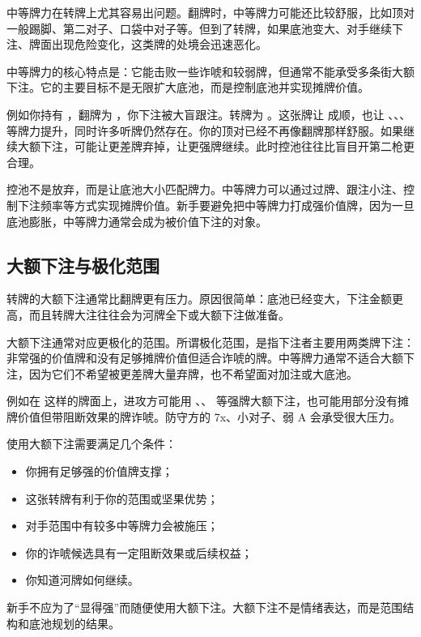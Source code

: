 中等牌力在转牌上尤其容易出问题。翻牌时，中等牌力可能还比较舒服，比如顶对一般踢脚、第二对子、口袋中对子等。但到了转牌，如果底池变大、对手继续下注、牌面出现危险变化，这类牌的处境会迅速恶化。

中等牌力的核心特点是：它能击败一些诈唬和较弱牌，但通常不能承受多条街大额下注。它的主要目标不是无限扩大底池，而是控制底池并实现摊牌价值。

例如你持有 ，翻牌为 ，你下注被大盲跟注。转牌为 。这张牌让  成顺，也让 、、、 等牌力提升，同时许多听牌仍然存在。你的顶对已经不再像翻牌那样舒服。如果继续大额下注，可能让更差牌弃掉，让更强牌继续。此时控池往往比盲目开第二枪更合理。

控池不是放弃，而是让底池大小匹配牌力。中等牌力可以通过过牌、跟注小注、控制下注频率等方式实现摊牌价值。新手要避免把中等牌力打成强价值牌，因为一旦底池膨胀，中等牌力通常会成为被价值下注的对象。

\subsection{大额下注与极化范围}

转牌的大额下注通常比翻牌更有压力。原因很简单：底池已经变大，下注金额更高，而且转牌大注往往会为河牌全下或大额下注做准备。

大额下注通常对应更极化的范围。所谓极化范围，是指下注者主要用两类牌下注：非常强的价值牌和没有足够摊牌价值但适合诈唬的牌。中等牌力通常不适合大额下注，因为它们不希望被更差牌大量弃牌，也不希望面对加注或大底池。

例如在  这样的牌面上，进攻方可能用 、、 等强牌大额下注，也可能用部分没有摊牌价值但带阻断效果的牌诈唬。防守方的 7x、小对子、弱 A 会承受很大压力。

使用大额下注需要满足几个条件：

\begin{itemize}
\item 你拥有足够强的价值牌支撑；
\item 这张转牌有利于你的范围或坚果优势；
\item 对手范围中有较多中等牌力会被施压；
\item 你的诈唬候选具有一定阻断效果或后续权益；
\item 你知道河牌如何继续。
\end{itemize}

新手不应为了“显得强”而随便使用大额下注。大额下注不是情绪表达，而是范围结构和底池规划的结果。

